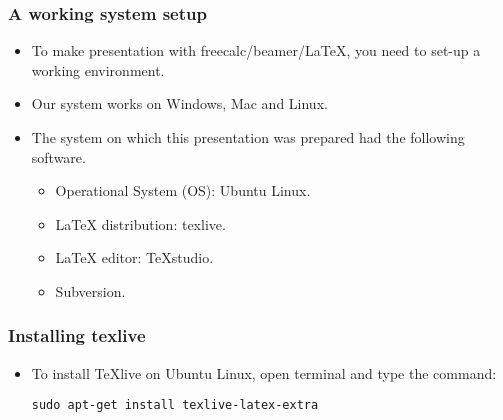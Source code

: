 \begin{frame}
\frametitle{A working system setup}
\begin{itemize}
\item To make presentation with freecalc/beamer/\LaTeX, you need to set-up a working environment.
\item Our system works on Windows, Mac and Linux. 
\item The system on which this presentation was prepared had the following software.
\begin{itemize}
\item Operational System (OS): Ubuntu Linux.
\item \LaTeX{} distribution: texlive.
\item \LaTeX{} editor: TeXstudio.
\item Subversion.
\end{itemize}
\end{itemize}
\end{frame}

\begin{frame}[fragile]
\frametitle{Installing texlive}

\begin{itemize}
\item To install TeXlive on Ubuntu Linux, open terminal and type the command:
\begin{verbatim}
sudo apt-get install texlive-latex-extra
\end{verbatim}

\end{itemize}
\end{frame}

